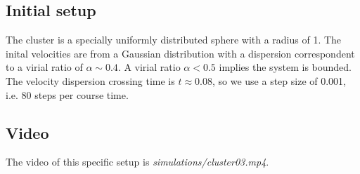 \subsection*{Initial setup}
The cluster is a specially uniformly distributed sphere with a radius of 1. The inital 
velocities are from a  Gaussian distribution with a dispersion correspondent to a virial ratio 
of $ \alpha \sim 0.4 $. A virial ratio $ \alpha < 0.5 $ implies the system is bounded. The 
velocity dispersion crossing time is $ t \approx 0.08 $, so we use a step size of 0.001, i.e. 
80 steps per course time.

\subsection{Video}
The video of this specific setup is \textit{simulations/cluster03.mp4}.



%

%


